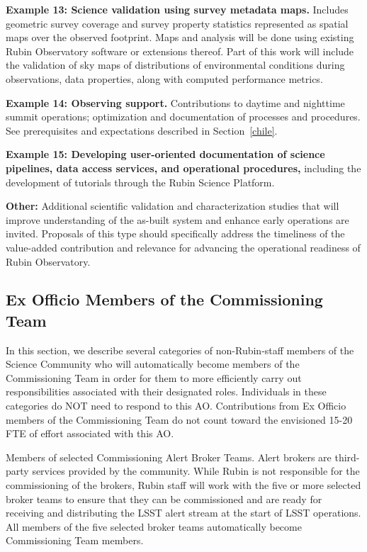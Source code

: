 \documentclass[SE,authoryear,toc,lsstdraft]{lsstdoc}
\begin{document}
\textbf{Example 13: Science validation using survey metadata maps.} Includes geometric survey coverage and survey property statistics represented as spatial maps over the observed footprint.  Maps and analysis will be done using existing Rubin Observatory software or extensions thereof.  Part of this work will include the validation of sky maps of distributions of environmental conditions during observations, data properties, along with computed performance metrics.

\textbf{Example 14: Observing support.} Contributions to daytime and nighttime summit operations; optimization and documentation of processes and procedures. See prerequisites and expectations described in Section~\ref{chile}.

\textbf{Example 15: Developing user-oriented documentation of science pipelines, data access services, and operational procedures,} including the development of tutorials through the Rubin Science Platform.

\textbf{Other:} Additional scientific validation and characterization studies that will improve understanding of the as-built system and enhance early operations are invited. Proposals of this type should specifically address the timeliness of the value-added contribution and relevance for advancing the operational readiness of Rubin Observatory.

\subsection{Ex Officio Members of the Commissioning Team}

In this section, we describe several categories of non-Rubin-staff members of the Science Community who will automatically become members of the Commissioning Team in order for them to more efficiently carry out responsibilities associated with their designated roles. Individuals in these categories do NOT need to respond to this AO. Contributions from Ex Officio members of the Commissioning Team do not count toward the envisioned 15-20 FTE of effort associated with this AO. 

Members of selected Commissioning Alert Broker Teams. Alert brokers are third-party services provided by the community. While Rubin is not responsible for the commissioning of the brokers, Rubin staff will work with the five or more selected broker teams to ensure that they can be commissioned and are ready for receiving and distributing the LSST alert stream at the start of LSST operations.  All members of the five selected broker teams automatically become Commissioning Team members.
\end{document}
